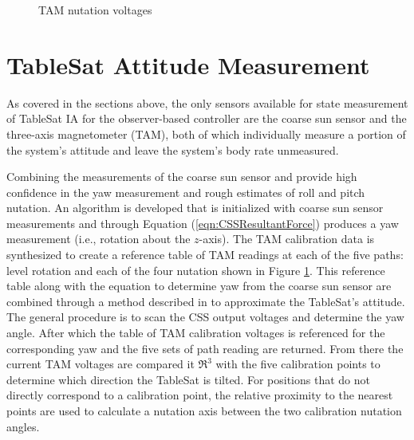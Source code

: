 \begin{figure}[H]
  \centerline{}
  \caption{TAM nutation voltages}
  \label{fig:TAMNutationVoltages}
\end{figure}

\section{TableSat Attitude Measurement}
\label{subsec:StateMeasurement}

As covered in the sections above, the only sensors available for state measurement of TableSat IA for the observer-based controller are the coarse sun sensor and the three-axis magnetometer (TAM), both of which individually measure a portion of the system's attitude and leave the system's body rate unmeasured.

Combining the measurements of the coarse sun sensor and provide high confidence in the yaw measurement and rough estimates of roll and pitch nutation.  An algorithm is developed that is initialized with coarse sun sensor measurements and through Equation (\ref{eqn:CSSResultantForce}) produces a yaw measurement (i.e., rotation about the $z$-axis).  The TAM calibration data is synthesized to create a reference table of TAM readings at each of the five paths: level rotation and each of the four nutation shown in Figure \ref{fig:TAMNutationVoltages}.  This reference table along with the equation to determine yaw from the coarse sun sensor are combined through a method described in \label{subsec:CalculateTAMNutationReferenceData} to approximate the TableSat's attitude.  The general procedure is to scan the CSS output voltages and determine the yaw angle.  After which the table of TAM calibration voltages is referenced for the corresponding yaw and the five sets of path reading are returned.  From there the current TAM voltages are compared it $\Re^3$ with the five calibration points to determine which direction the TableSat is tilted.  For positions that do not directly correspond to a calibration point, the relative proximity to the nearest points are used to calculate a nutation axis between the two calibration nutation angles.
